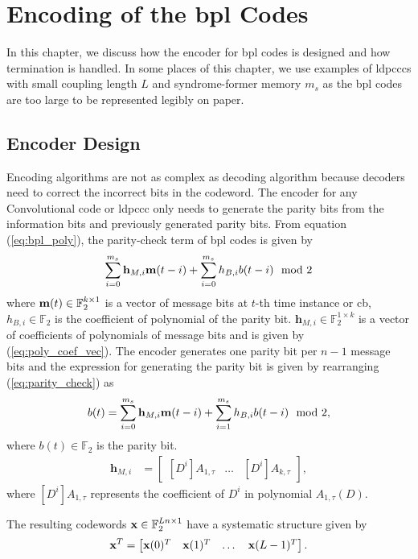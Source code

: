 \chapter{Encoding of the \texorpdfstring{\acrlong{bpl}}{BPL} Codes}\label{ch:encode}
In this chapter, we discuss how the encoder for \gls{bpl} codes is designed and how termination is handled. In some places of this chapter, we use examples of \glspl{ldpccc} with small coupling length $L$ and syndrome-former memory $m_s$ as the \gls{bpl} codes are too large to be represented legibly on paper.

\section{Encoder Design}\label{sec:enc_design}
Encoding algorithms are not as complex as decoding algorithm because decoders need to correct the incorrect bits in the codeword. The encoder for any Convolutional code or \gls{ldpccc} only needs to generate the parity bits from the information bits and previously generated parity bits. From equation (\ref{eq:bpl_poly}), the parity-check term of \gls{bpl} codes is given by
\begin{align}\label{eq:parity_check}
\sum_{i=0}^{m_s}\mathbf{h}_{M,i}\mathbf{m}(t-i)+\sum_{i=0}^{m_s}h_{B,i}b(t-i) \mod 2
\end{align}
where $\mathbf{m}(t)\in\mathbb{F}_2^{k\times 1}$ is a vector of message bits at $t$-th time instance or \gls{cb}, $h_{B,i}\in\mathbb{F}_2$ is the coefficient of polynomial of the parity bit. $\mathbf{h}_{M,i}\in\mathbb{F}_2^{1\times k}$ is a vector of coefficients of polynomials of message bits and is given by (\ref{eq:poly_coef_vec}).
The encoder generates one parity bit per $n-1$ message bits and the expression for generating the parity bit is given by rearranging (\ref{eq:parity_check}) as
\begin{align}\label{eq:parity_bit}
b(t)=\sum_{i=0}^{m_s}\mathbf{h}_{M,i}\mathbf{m}(t-i)+\sum_{i=1}^{m_s}h_{B,i}b(t-i) \mod 2,
\end{align}
where $b(t)\in\mathbb{F}_2$ is the parity bit.
\begin{align}\label{eq:poly_coef_vec}
\mathbf{h}_{M,i}&=
\begin{bmatrix}
[D^i]A_{1,\tau} &\dots &[D^i]A_{k,\tau}
\end{bmatrix},
\end{align}
where $[D^i]A_{1,\tau}$ represents the coefficient of $D^i$ in polynomial $A_{1,\tau}(D)$.

The resulting codewords $\mathbf{x}\in\mathbb{F}_2^{Ln\times 1}$ have a systematic structure given by \begin{align}\mathbf{x}^T=\begin{bmatrix}\mathbf{x}(0)^T &\mathbf{x}(1)^T &\dots &\mathbf{x}(L-1)^T\end{bmatrix}.\end{align}

